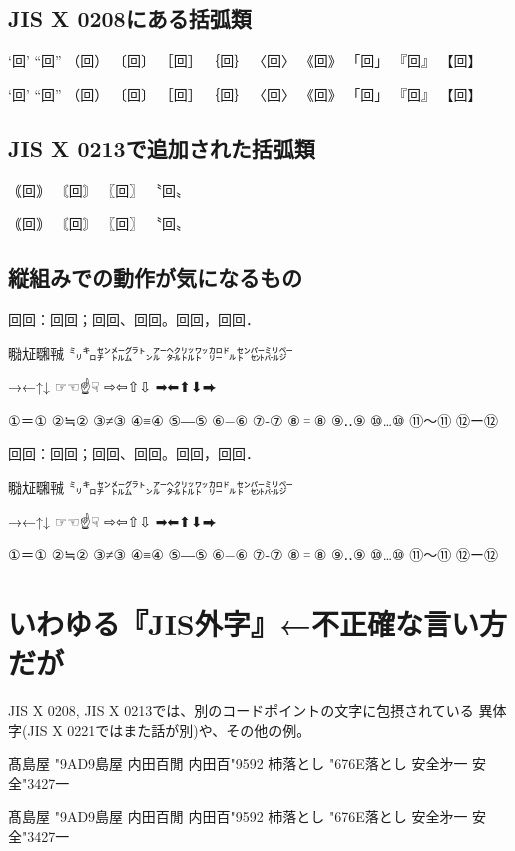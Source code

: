 \documentclass{ujarticle}
\begin{document}
\subsection{JIS X 0208にある括弧類}
‘回’ “回” （回） 〔回〕 ［回］ ｛回｝ 〈回〉 《回》 「回」 『回』 【回】

{\gt
‘回’ “回” （回） 〔回〕 ［回］ ｛回｝ 〈回〉 《回》 「回」 『回』 【回】
}


\subsection{JIS X 0213で追加された括弧類}
｟回｠ 〘回〙 〖回〗 〝回〟

{\gt
｟回｠ 〘回〙 〖回〗 〝回〟
}


\subsection{縦組みでの動作が気になるもの}
回回：回回；回回、回回。回回，回回．

㍾㍽㍼㍻ ㍉㌔㌢㍍㌘㌧㌃㌶㍑㍗㌍㌦㌣㌫㍊㌻

→←↑↓ ☞☜☝☟ ⇨⇦⇧⇩ ➡⬅⬆⬇⮕

①＝① ②≒② ③≠③ ④≡④ ⑤―⑤ ⑥−⑥ ⑦‐⑦ ⑧゠⑧ ⑨‥⑨ ⑩…⑩ ⑪〜⑪ ⑫ー⑫

{\gt
回回：回回；回回、回回。回回，回回．

㍾㍽㍼㍻ ㍉㌔㌢㍍㌘㌧㌃㌶㍑㍗㌍㌦㌣㌫㍊㌻

→←↑↓ ☞☜☝☟ ⇨⇦⇧⇩ ➡⬅⬆⬇⮕

①＝① ②≒② ③≠③ ④≡④ ⑤―⑤ ⑥−⑥ ⑦‐⑦ ⑧゠⑧ ⑨‥⑨ ⑩…⑩ ⑪〜⑪ ⑫ー⑫
}

\section{いわゆる『JIS外字』←不正確な言い方だが}
JIS X 0208, JIS X 0213では、別のコードポイントの文字に包摂されている
異体字(JIS X 0221ではまた話が別)や、その他の例。

髙島屋 \char"9AD9島屋\quad%
内田百閒 内田百\char"9592\quad%
杮落とし \char"676E落とし\quad%
安全﻿㐧一 安全\char"3427一\quad%

{\gt
髙島屋 \char"9AD9島屋\quad%
内田百閒 内田百\char"9592\quad%
杮落とし \char"676E落とし\quad%
安全﻿㐧一 安全\char"3427一\quad%
}
\end{document}
